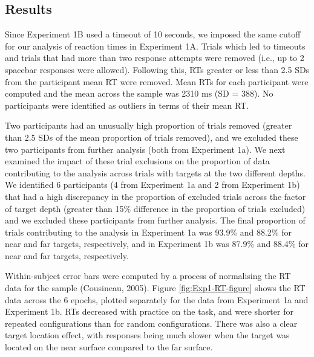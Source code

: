 \documentclass[
  man,floatsintext]{apa7}
\begin{document}
\hypertarget{results}{%
\subsection{Results}\label{results}}

Since Experiment 1B used a timeout of 10 seconds, we imposed the same cutoff for our analysis of reaction times in Experiment 1A. Trials which led to timeouts and trials that had more than two response attempts were removed (i.e., up to 2 spacebar responses were allowed). Following this, RTs greater or less than 2.5 SDs from the participant mean RT were removed. Mean RTs for each participant were computed and the mean across the sample was 2310 ms (SD = 388). No participants were identified as outliers in terms of their mean RT.

Two participants had an unusually high proportion of trials removed (greater than 2.5 SDs of the mean proportion of trials removed), and we excluded these two participants from further analysis (both from Experiment 1a). We next examined the impact of these trial exclusions on the proportion of data contributing to the analysis across trials with targets at the two different depths. We identified 6 participants (4 from Experiment 1a and 2 from Experiment 1b) that had a high discrepancy in the proportion of excluded trials across the factor of target depth (greater than 15\% difference in the proportion of trials excluded) and we excluded these participants from further analysis. The final proportion of trials contributing to the analysis in Experiment 1a was 93.9\% and 88.2\% for near and far targets, respectively, and in Experiment 1b was 87.9\% and 88.4\% for near and far targets, respectively.

Within-subject error bars were computed by a process of normalising the RT data for the sample (Cousineau, 2005). Figure \ref{fig:Exp1-RT-figure} shows the RT data across the 6 epochs, plotted separately for the data from Experiment 1a and Experiment 1b. RTs decreased with practice on the task, and were shorter for repeated configurations than for random configurations. There was also a clear target location effect, with responses being much slower when the target was located on the near surface compared to the far surface.
\end{document}
